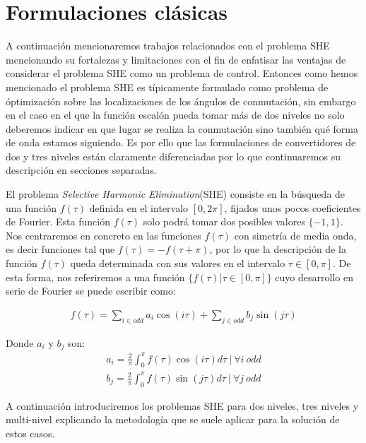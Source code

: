 \section{Formulaciones clásicas}

A continuación mencionaremos trabajos relacionados con el problema SHE mencionando su fortalezas y limitaciones con el fin de enfatisar las ventajas de considerar el problema SHE como un problema de control. Entonces como hemos mencionado el problema SHE es típicamente formulado como problema de óptimización sobre las localizaciones de los ángulos de conmutación, sin embargo en el caso en el que la función escalón pueda tomar más de dos niveles no solo deberemos indicar en que lugar se realiza la conmutación sino también qué forma de onda estamos siguiendo. Es por ello que las formulaciones de convertidores de dos y tres niveles están claramente diferenciadas por lo que continuaremos su descripción en secciones separadas.
\newline 

El problema \emph{Selective Harmonic Elimination}(SHE) consiste en la búsqueda de una función $f(\tau )$ definida en el intervalo $[0,2\pi]$, fijados unos pocos coeficientes de Fourier. Esta función $f(\tau)$ solo podrá tomar dos posibles valores $\{-1,1\}$.
%
Nos centraremos en concreto en las funciones $f(\tau)$ con simetría de media onda, es decir funciones tal que $f(\tau) = -f(\tau + \pi)$, por lo que la descripción de la función $f(\tau)$ queda determinada con sus valores en el intervalo $\tau \in [0,\pi]$. De esta forma, nos referiremos a una función $\{ f(\tau)  | \tau \in [0,\pi] \}$ cuyo desarrollo en serie de Fourier se puede escribir como:

\begin{gather}
    f(\tau ) = \sum_{i \in odd} a_i \cos(i\tau)+ \sum_{j \in odd}  b_j \sin(j \tau) 
\end{gather}

Donde $a_i$ y $b_j$  son:
\begin{gather}
    a_i = \frac{2}{\pi} \int_0^\pi f(\tau ) \cos(i \tau)d\tau \ | \ \forall i \ odd \label{an}\\
    b_j = \frac{2}{\pi} \int_0^\pi f(\tau)  \sin(j \tau) d\tau \ | \ \forall j \ odd \label{bn}
\end{gather}

A continuación introduciremos los problemas SHE para dos niveles, tres niveles y multi-nivel explicando la metodología que se suele aplicar para la solución de estos casos.


